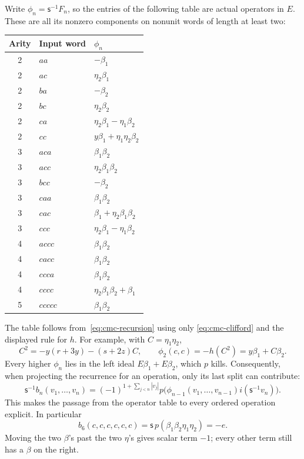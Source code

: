 Write \(\phi_n=\mathsf{s}^{-1}F_n\), so the entries of the following table
are actual operators in \(E\). These are all its nonzero components
on nonunit words of length at least two:

\begin{longtable}{c l l}
\toprule
Arity & Input word & \(\phi_n\) \\
\midrule
\endhead
2 & \(aa\) & \(-\beta_1\) \\
2 & \(ac\) & \(\eta_2\beta_1\) \\
2 & \(ba\) & \(-\beta_2\) \\
2 & \(bc\) & \(\eta_2\beta_2\) \\
2 & \(ca\) & \(\eta_2\beta_1-\eta_1\beta_2\) \\
2 & \(cc\) & \(y\beta_1+\eta_1\eta_2\beta_2\) \\
3 & \(aca\) & \(\beta_1\beta_2\) \\
3 & \(acc\) & \(\eta_2\beta_1\beta_2\) \\
3 & \(bcc\) & \(-\beta_2\) \\
3 & \(caa\) & \(\beta_1\beta_2\) \\
3 & \(cac\) & \(\beta_1+\eta_2\beta_1\beta_2\) \\
3 & \(ccc\) & \(\eta_2\beta_1-\eta_1\beta_2\) \\
4 & \(accc\) & \(\beta_1\beta_2\) \\
4 & \(cacc\) & \(\beta_1\beta_2\) \\
4 & \(ccca\) & \(\beta_1\beta_2\) \\
4 & \(cccc\) & \(\eta_2\beta_1\beta_2+\beta_1\) \\
5 & \(ccccc\) & \(\beta_1\beta_2\) \\
\bottomrule
\end{longtable}

The table follows from~\eqref{eq:cmc-recursion} using only
\eqref{eq:cmc-clifford} and the displayed rule for \(h\).
For example, with \(C=\eta_1\eta_2\),
\[
 C^2=-y(r+3y)-(s+2z)C,\qquad
 \phi_2(c,c)=-h(C^2)=y\beta_1+C\beta_2.
\]
Every higher \(\phi_n\) lies in the left ideal
\(E\beta_1+E\beta_2\), which \(p\) kills.
Consequently, when projecting the recurrence for an operation,
only its last split can contribute:
\begin{equation}\label{eq:cmc-last-split}
 \mathsf{s}^{-1}b_n(v_1,\ldots,v_n)=
 (-1)^{1+\sum_{j<n}|v_j|}
 p\bigl(\phi_{n-1}(v_1,\ldots,v_{n-1})i(\mathsf{s}^{-1}v_n)\bigr).
\end{equation}
This makes the passage from the operator table to every ordered
operation explicit. In particular
\[
 b_6(c,c,c,c,c,c)
 =\mathsf{s}\,p(\beta_1\beta_2\eta_1\eta_2)=-e.
\]
Moving the two \(\beta\)'s past the two \(\eta\)'s gives scalar
term \(-1\); every other term still has a \(\beta\) on the right.

